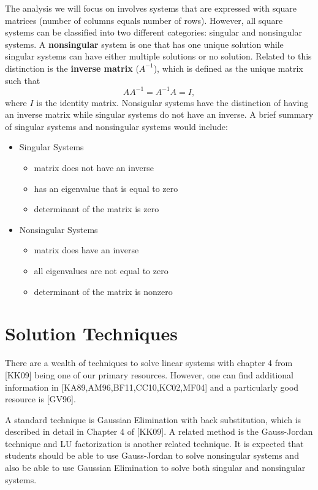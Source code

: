 \documentclass[twoside]{article}
\renewcommand{\cite}[1]{[#1]}
\def\ds{\displaystyle}
\begin{document}
The analysis we will focus on involves systems that are expressed with square matrices (number of columns equals number of rows). However, all square systems can be classified into two different categories: singular and nonsingular systems. A {\bf nonsingular} system is one that has one unique solution while singular systems can have either multiple solutions or no solution. Related to this distinction is the {\bf inverse matrix} ($\ds A^{-1}$), which is defined as the unique matrix such that
$$AA^{-1}=A^{-1}A=I,$$
where $I$ is the identity matrix. Nonsigular systems have the distinction of having an inverse matrix while singular systems do not have an inverse. A brief summary of singular systems and nonsingular systems would include:
\begin{itemize}
    \item Singular Systems
    \begin{itemize}
        \item matrix does not have an inverse
        \item has an eigenvalue that is equal to zero
        \item determinant of the matrix is zero
    \end{itemize}
    \item Nonsingular Systems
    \begin{itemize}
        \item matrix does have an inverse
        \item all eigenvalues are not equal to zero
        \item determinant of the matrix is nonzero
    \end{itemize}
\end{itemize}

\section{Solution Techniques}
There are a wealth of techniques to solve linear systems with chapter 4 from \cite{KK09} being one of our primary resources. However, one can find additional information in \cite{KA89,AM96,BF11,CC10,KC02,MF04} and a particularly good resource is \cite{GV96}.

A standard technique is Gaussian Elimination with back substitution, which is described in detail in Chapter 4 of \cite{KK09}. A related method is the Gauss-Jordan technique and LU factorization is another related technique. It is expected that students should be able to use Gauss-Jordan to solve nonsingular systems and also be able to use Gaussian Elimination to solve both singular and nonsingular systems. 
\end{document}
